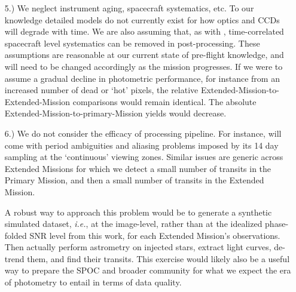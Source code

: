 \begin{itemize}
	
	
	\item [5.) We neglect instrument aging, spacecraft systematics, etc.]
	To our knowledge detailed models do not currently exist for how \tesss 
	optics and CCDs will degrade with time.
	We are also assuming that, as with \ktwo\!, time-correlated spacecraft level systematics can be removed in post-processing.
	These assumptions are reasonable at our current state of pre-flight knowledge, and will need to be changed accordingly as the mission progresses.
	If we were to assume a gradual decline in photometric performance, for instance from an increased number of dead or `hot' pixels, the relative Extended-Mission-to-Extended-Mission comparisons would remain identical.
	The absolute Extended-Mission-to-primary-Mission yields would decrease.
	
	\item [6.) We do not consider the efficacy of processing pipeline.]
	For instance, \hemis\:will come with period ambiguities and aliasing problems imposed by its 14 day sampling at the `continuous' viewing zones.
	Similar issues are generic across Extended Missions for which we detect a small number of transits in the Primary Mission, and then a small number of transits in the Extended Mission.
	
	A robust way to approach this problem would be to generate a synthetic simulated \tess dataset, \textit{i.e.}, at the image-level, rather than at the idealized phase-folded SNR level from this work, for each Extended Mission's observations.
	Then actually perform astrometry on injected stars, extract light curves, de-trend them, and find their transits.
	This exercise would likely also be a useful way to prepare the SPOC and broader community for what we expect the era of \tess photometry to entail in terms of data quality.	
\end{itemize}



